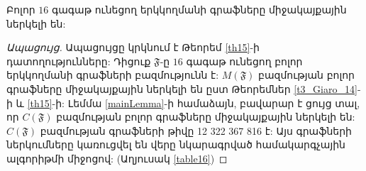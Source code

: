 \begin{hide}
\begin{theorem}
\label{th16}
Բոլոր $16$ գագաթ ունեցող երկկողմանի գրաֆները միջակայքային ներկելի են:
\end{theorem}
\begin{proof}[Ապացույց]
Ապացույցը կրկնում է Թեորեմ \ref{th15}-ի դատողությունները: Դիցուք $\mathfrak{F}$-ը $16$ գագաթ ունեցող բոլոր երկկողմանի գրաֆների բազմությունն է: $M(\mathfrak{F})$ բազմության բոլոր գրաֆները միջակայքային ներկելի են ըստ Թեորեմներ \ref{t3_Giaro_14}-ի և \ref{th15}-ի: Լեմմա \ref{mainLemma}-ի համաձայն, բավարար է ցույց տալ, որ $C(\mathfrak{F})$ բազմության բոլոր գրաֆները միջակայքային ներկելի են: $C(\mathfrak{F})$ բազմության գրաֆների թիվը 12 322 367 816 է: Այս գրաֆների ներկումները կառուցվել են վերը նկարագրված համակարգչային ալգորիթմի միջոցով: (Աղյուսակ \ref{table16})
\end{proof}
\end{hide}